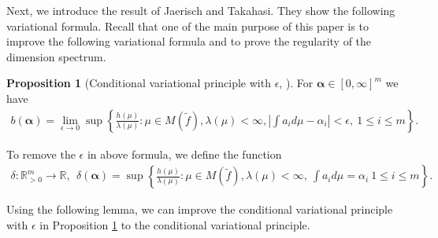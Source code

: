 \documentclass{article}
\theoremstyle{definition}
\newtheorem{prop}[thm]{Proposition}
\begin{document}
Next, we introduce the result of Jaerisch and Takahasi. They show the following variational formula. Recall that one of the main purpose of this paper is to improve the following variational formula and to prove the regularity of the dimension spectrum.  

\begin{prop}[Conditional variational principle with $\epsilon$,
{\cite[Proposition 2.1]{jaerisch2021mixed}}]\label{conditional variational principle with epsilon}
For $\boldsymbol{\alpha}\in[0,\infty]^m$ we have
\begin{align}
b(\boldsymbol{\alpha}) = \lim_{\epsilon \to 0}\sup \left\{ \frac{h(\mu)}{\lambda(\mu)}: \mu \in M(\tilde f),\lambda(\mu)<\infty, \left|\int a_i d \mu - \alpha_i  \right|<\epsilon,\ 1\leq i\leq m 
   \right\}.\nonumber
\end{align}
\end{prop}



To remove the $\epsilon$ in above formula, we define the function
\begin{align}
    \delta:\mathbb{R}^m_{>0}\rightarrow \mathbb{R},\ \ \delta(\boldsymbol{\alpha})=\sup \left\{ \frac{h(\mu)}{\lambda(\mu)}: \mu \in M(\tilde f),\lambda(\mu)<\infty,\ \int a_i d \mu = \alpha_i\ 1\leq i\leq m 
   \right\}.\nonumber
\end{align}



Using the following lemma, we can improve the conditional variational principle with $\epsilon$ in Proposition \ref{conditional variational principle with epsilon} to the conditional variational principle.
\end{document}
